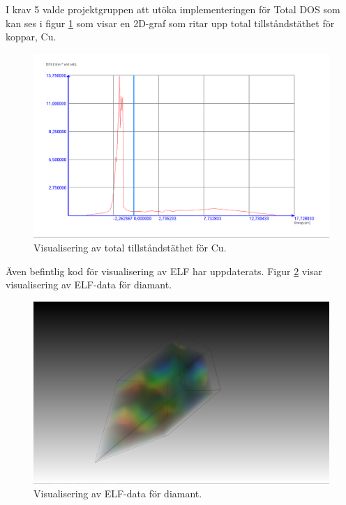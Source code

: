 \documentclass[a4paper,12pt,twoside,openright]{report}
\begin{document}
I krav 5 valde projektgruppen att utöka implementeringen för Total DOS som kan ses i figur \ref{fig:visualisering_total_DOS_Cu} som visar en 2D-graf som ritar upp total tillståndstäthet för koppar, Cu.
\begin{figure}[H]
	\centering
	\includegraphics[scale=0.3]{Cu_1_10_total_DOS_visualisering.png}
	\caption{Visualisering av total tillståndstäthet för Cu.}
	\label{fig:visualisering_total_DOS_Cu}
\end{figure}

Även befintlig kod för visualisering av ELF har uppdaterats. Figur \ref{fig:visualisering_diamant_elf} visar visualisering av ELF-data för diamant. 
\begin{figure}[H]
	\centering
	\includegraphics[scale=0.15]{Diamant_elf_visualisering.png}
	\caption{Visualisering av ELF-data för diamant.}
	\label{fig:visualisering_diamant_elf}
\end{figure}
\end{document}
